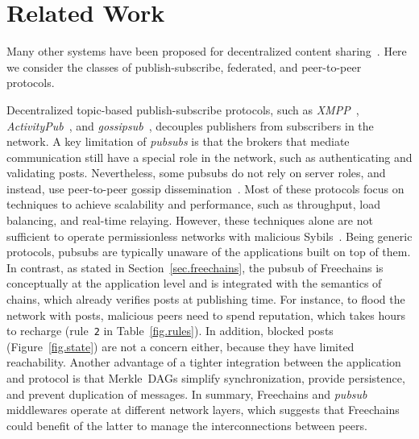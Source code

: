 \documentclass[12pt]{article}
\newcommand{\FC}       {Freechains\xspace}
\newcommand{\code}[1]  {\texttt{\footnotesize{#1}}}
\begin{document}
\section{Related Work}
\label{sec.related}

Many other systems have been proposed for decentralized content
sharing~\cite{p2p.survey,p2p.ecosystem}.
Here we consider the classes of publish-subscribe, federated, and peer-to-peer
protocols.


Decentralized topic-based publish-subscribe protocols, such as
    \emph{XMPP}~\cite{pubsub.xmpp},
    \emph{ActivityPub}~\cite{pubsub.activitypub}, and
    \emph{gossipsub}~\cite{pubsub.gossipsub},
decouples publishers from subscribers in the network.
%
A key limitation of \emph{pubsubs} is that the brokers that mediate
communication still have a special role in the network, such as authenticating
and validating posts.
%
Nevertheless, some pubsubs do not rely on server roles, and instead, use
peer-to-peer gossip dissemination~\cite{pubsub.tera,pubsub.rappel,pubsub.stan,pubsub.vitis,pubsub.gossipsub,pubsub.rappel}.
Most of these protocols focus on techniques to achieve scalability and
performance, such as throughput, load balancing, and real-time relaying.
%
However, these techniques alone are not sufficient to operate permissionless
networks with malicious Sybils~\cite{pubsub.gossipsub2}.
Being generic protocols, pubsubs are typically unaware of the applications
built on top of them.
%
In contrast, as stated in Section~\ref{sec.freechains}, the pubsub of \FC is
conceptually at the application level and is integrated with the semantics of
chains, which already verifies posts at publishing time.
For instance, to flood the network with posts, malicious peers need to spend
reputation, which takes hours to recharge (rule~\code{2} in
Table~\ref{fig.rules}).
In addition, blocked posts (Figure~\ref{fig.state}) are not a concern either,
because they have limited reachability.
Another advantage of a tighter integration between the application and protocol
is that Merkle~DAGs simplify synchronization, provide persistence, and prevent
duplication of messages.
%
In summary, \FC and \emph{pubsub} middlewares operate at different network
layers, which suggests that \FC could benefit of the latter to manage the
interconnections between peers.
\end{document}
